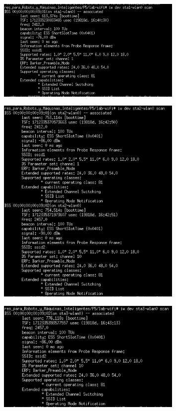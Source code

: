 \documentclass[12pt, a4paper]{report}
\begin{document}
\begin{enumerate}
	\begin{figure}[H]
		\centering
		\includegraphics[width=0.8\textwidth]{ej1.14_1}
	\end{figure}
	\begin{figure}[H]
		\centering
		\includegraphics[width=0.8\textwidth]{ej1.14_2}
	\end{figure}	
	\begin{figure}[H]
		\centering
		\includegraphics[width=0.8\textwidth]{ej1.14_3}

\end{figure}
\end{enumerate}
\end{document}
